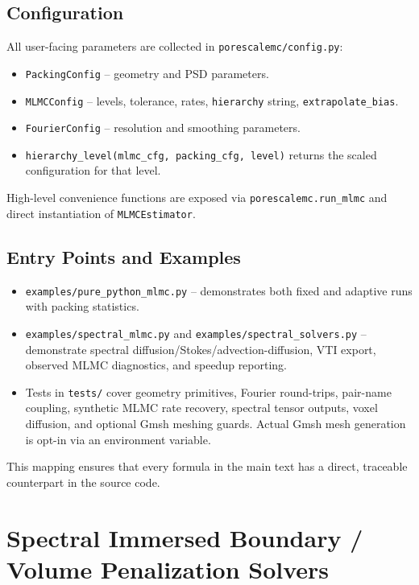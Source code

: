 \documentclass[preprint,12pt]{elsarticle}
\begin{document}
\subsection{Configuration}
All user-facing parameters are collected in \texttt{porescalemc/config.py}:
\begin{itemize}
  \item \texttt{PackingConfig} -- geometry and PSD parameters.
  \item \texttt{MLMCConfig} -- levels, tolerance, rates, \texttt{hierarchy} string, \texttt{extrapolate\_bias}.
  \item \texttt{FourierConfig} -- resolution and smoothing parameters.
  \item \texttt{hierarchy\_level(mlmc\_cfg, packing\_cfg, level)} returns the scaled configuration for that level.
\end{itemize}

High-level convenience functions are exposed via \texttt{porescalemc.run\_mlmc} and direct instantiation of \texttt{MLMCEstimator}.

\subsection{Entry Points and Examples}
\begin{itemize}
  \item \texttt{examples/pure\_python\_mlmc.py} -- demonstrates both fixed and adaptive runs with packing statistics.
  \item \texttt{examples/spectral\_mlmc.py} and \texttt{examples/spectral\_solvers.py} -- demonstrate spectral diffusion/Stokes/advection-diffusion, VTI export, observed MLMC diagnostics, and speedup reporting.
  \item Tests in \texttt{tests/} cover geometry primitives, Fourier round-trips, pair-name coupling, synthetic MLMC rate recovery, spectral tensor outputs, voxel diffusion, and optional Gmsh meshing guards. Actual Gmsh mesh generation is opt-in via an environment variable.
\end{itemize}

This mapping ensures that every formula in the main text has a direct, traceable counterpart in the source code.

\section{Spectral Immersed Boundary / Volume Penalization Solvers}
\label{app:spectral_solvers}
\end{document}
